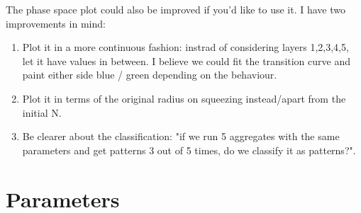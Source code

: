 \documentclass{article}
\begin{document}
The phase space plot could also be improved if you'd like to use it. I have two improvements in mind:
\begin{enumerate}
    \item Plot it in a more continuous fashion: instrad of considering layers 1,2,3,4,5, let it have values in between. I believe we could fit the transition curve and paint either side blue / green depending on the behaviour.
    \item Plot it in terms of the original radius on squeezing instead/apart from the initial N.
    \item Be clearer about the classification: "if we run 5 aggregates with the same parameters and get patterns 3 out of 5 times, do we classify it as patterns?".
\end{enumerate}



\newpage
\section{Parameters}
\end{document}
